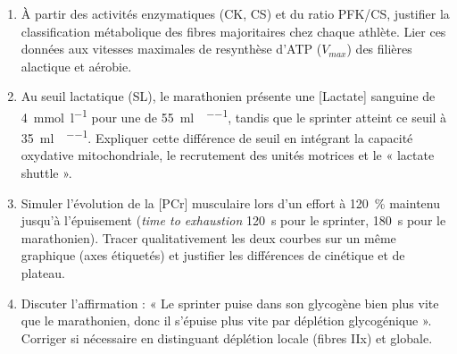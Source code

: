 \documentclass[11pt]{article}
\begin{document}
\begin{exercice}
\begin{enumerate}
    \item À partir des activités enzymatiques (CK, CS) et du ratio PFK/CS, justifier la classification métabolique des fibres majoritaires chez chaque athlète. Lier ces données aux vitesses maximales de resynthèse d'ATP ($V_{max}$) des filières alactique et aérobie.
    \item Au seuil lactatique (SL), le marathonien présente une [Lactate] sanguine de \SI{4}{\milli\mole\per\litre} pour une  de \SI{55}{\milli\litre\per\min\per\kilo}, tandis que le sprinter atteint ce seuil à \SI{35}{\milli\litre\per\min\per\kilo}. Expliquer cette différence de seuil en intégrant la capacité oxydative mitochondriale, le recrutement des unités motrices et le « lactate shuttle ».
    \item Simuler l'évolution de la [PCr] musculaire lors d'un effort à \SI{120}{\%}  maintenu jusqu'à l'épuisement (\textit{time to exhaustion} \approx \SI{120}{\second} pour le sprinter, \SI{180}{\second} pour le marathonien). Tracer qualitativement les deux courbes sur un même graphique (axes étiquetés) et justifier les différences de cinétique et de plateau.
    \item Discuter l'affirmation : « Le sprinter puise dans son glycogène bien plus vite que le marathonien, donc il s'épuise plus vite par déplétion glycogénique ». Corriger si nécessaire en distinguant déplétion locale (fibres IIx) et globale.
\end{enumerate}
\end{exercice}
\end{document}
